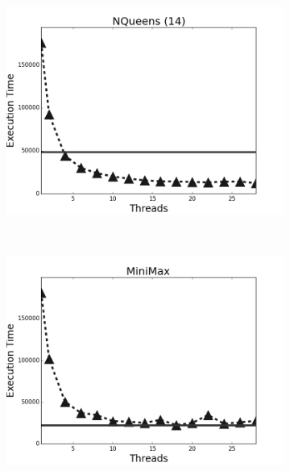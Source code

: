 \begin{figure}[h]
        \centering
        \begin{subfigure}[b]{0.5\textwidth}
                \includegraphics[width=\textwidth]{experiments/scalability/scale-8queens-14.png}
                \label{fig:implementation:scale_queens}
        \end{subfigure}%
        ~
        \begin{subfigure}[b]{0.5\textwidth}
                \includegraphics[width=\textwidth]{experiments/scalability/scale-min-max-tictactoe.png}


\end{subfigure}
\end{figure}
